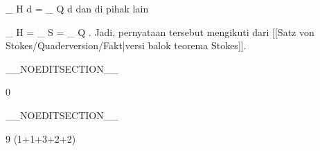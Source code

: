 {{\mavergleichskettedisp
{\vergleichskette
{
\int_{ H  }  d\omega
}
{ =} {
\int_{ Q  }  d\omega
}
{ } {
}
{ } {
}
{ } {
}
}
{}{}{}
dan di pihak lain

\mavergleichskettedisp
{\vergleichskette
{
\int_{  \partial H  }   \omega
}
{ =} {
\int_{  S  }   \omega
}
{ =} {
\int_{  \partial Q  }   \omega
}
{ } {
}
{ } {
}
}
{}{}{.}
Jadi, pernyataan tersebut mengikuti dari [[Satz von Stokes/Quaderversion/Fakt|versi balok teorema Stokes]].}
{}

}

__NOEDITSECTION__

{0}

{

}
{  }

__NOEDITSECTION__

{9 (1+1+3+2+2)}

